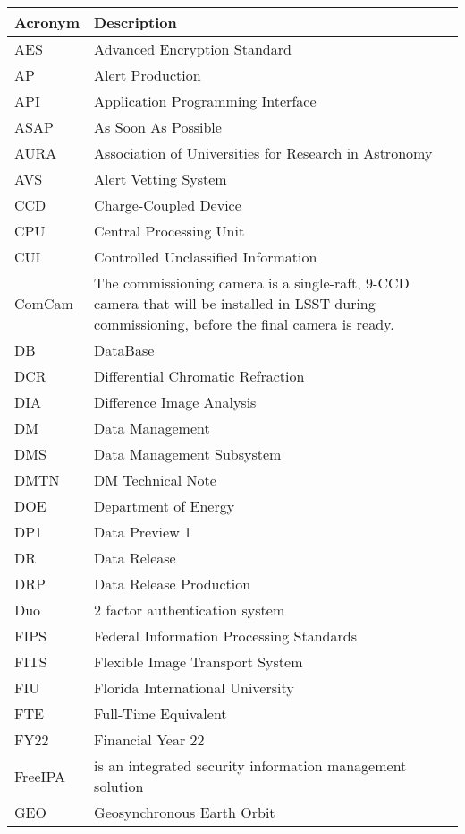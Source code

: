 \addtocounter{table}{-1}
\begin{longtable}{p{}p{}}\hline
\textbf{Acronym} & \textbf{Description}  \\\hline

AES & Advanced Encryption Standard \\\hline
AP & Alert Production \\\hline
API & Application Programming Interface \\\hline
ASAP & As Soon As Possible \\\hline
AURA & Association of Universities for Research in Astronomy \\\hline
AVS & Alert Vetting System \\\hline
CCD & Charge-Coupled Device \\\hline
CPU & Central Processing Unit \\\hline
CUI & Controlled Unclassified Information \\\hline
ComCam & The commissioning camera is a single-raft, 9-CCD camera that will be installed in LSST during commissioning, before the final camera is ready. \\\hline
DB & DataBase \\\hline
DCR & Differential Chromatic Refraction \\\hline
DIA & Difference Image Analysis \\\hline
DM & Data Management \\\hline
DMS & Data Management Subsystem \\\hline
DMTN & DM Technical Note \\\hline
DOE & Department of Energy \\\hline
DP1 & Data Preview 1 \\\hline
DR & Data Release \\\hline
DRP & Data Release Production \\\hline
Duo & 2 factor authentication system \\\hline
FIPS & Federal Information Processing Standards \\\hline
FITS & Flexible Image Transport System \\\hline
FIU & Florida International University \\\hline
FTE & Full-Time Equivalent \\\hline
FY22 & Financial Year 22 \\\hline
FreeIPA & is an integrated security information management solution \\\hline
GEO & Geosynchronous Earth Orbit \\\hline

\end{longtable}
